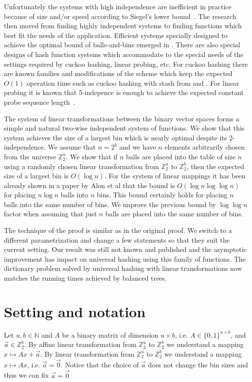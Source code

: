 \documentclass{article}
\newcommand{\vecspace}[2]{\mathbb{Z}_{#1}^{#2}}
\newcommand{\binvecspace}[1]{\vecspace{2}{#1}}
\begin{document}
Unfortunately the systems with high independence are inefficient in practice because of size and/or speed according to Siegel's lower bound~\cite{siegel}. 
The research then moved from finding highly independent systems to finding functions which best fit the needs of the application. 
Efficient systems specially designed to achieve the optimal bound of balls-and-bins emerged in \cite{celisetal}.
There are also special designs of hash function systems which accommodate to the special needs of the settings required by cuckoo hashing, linear probing, etc.
For cuckoo hashing there are known families and modifications of the scheme which keep the expected $O(1)$ operation time such as cuckoo hashing with stash from \cite{mitzenmacher-cuckoo} and \cite{dietzfelbinger-cuckoo}.
For linear probing it is known that 5-indepence is enough to achieve the expected constant probe sequence length~\cite{linear-probing}.

The system of linear transformations between the binary vector spaces forms a simple and natural two-wise independent system of functions.
We show that this system achieves the size of a largest bin which is nearly optimal despite its 2-independence.
We assume that $n = 2^b$ and we have $n$ elements arbitrarily chosen from the universe $\binvecspace{u}$.
We show that if $n$ balls are placed into the table of size $n$ using a randomly chosen linear transformation from $\binvecspace{u}$ to $\binvecspace{b}$, then the expected size of a largest bin is $O(\log n)$.
For the system of linear mappings it has been already shown in a paper by Alon et al \cite{alonetal} that the bound is $O(\log n \log \log n)$ for placing $n \log n$ balls into $n$ bins.
This bound certainly holds for placing $n$ balls into the same number of bins.
We improve the previous bound by $\log \log n$ factor when assuming that just $n$ balls are placed into the same number of bins.

The technique of the proof is similar as in the original proof. 
We switch to a different parametrization and change a few statements so that they suit the current setting.
Our result was still not known and published and the asymptotic improvement has impact on universal hashing using this family of functions.
The dictionary problem solved by universal hashing with linear transformations now matches the running times achieved by balanced trees.

\section{Setting and notation}
Let $u, b \in \mathbb{N}$ and $A$ be a binary matrix of dimension $u \times b$, i.e. $A \in \{0, 1\}^{u \times b}$, and $\vec{a} \in \binvecspace{b}$. 
By affine linear transformation from $\binvecspace{u}$ to $\binvecspace{b}$ we understand a mapping $x \mapsto Ax + \vec{a}$.
By linear transformation from $\binvecspace{u}$ to $\binvecspace{b}$
we understand a mapping $x \mapsto Ax$, i.e. $\vec{a} = \vec{0}$.
Notice that the choice of $\vec{a}$ does not change the bin sizes and thus we can fix $\vec{a} = \vec{0}$
\end{document}
